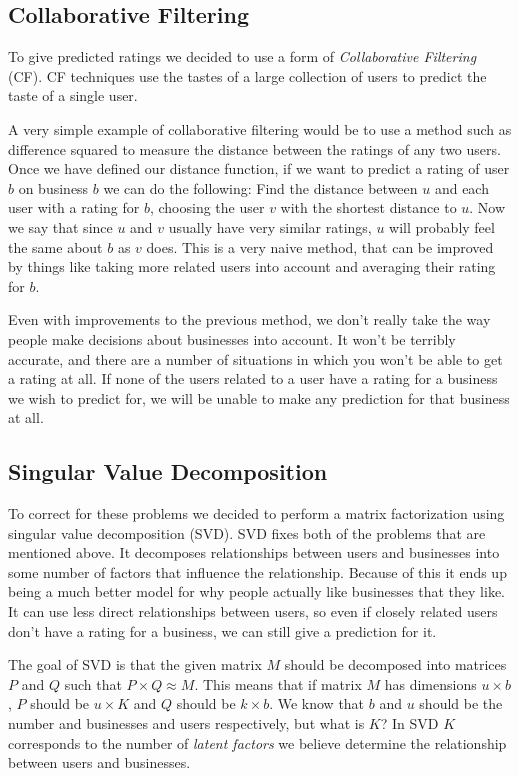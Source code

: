 \subsection{Collaborative Filtering}

To give predicted ratings we decided to use a form of \emph{Collaborative
Filtering} (CF). CF techniques use the tastes of a large collection of users to
predict the taste of a single user.

A very simple example of collaborative filtering would be to use a method such
as difference squared to measure the distance between the ratings of any two
users. Once we have defined our distance function, if we want to predict a
rating of user $b$ on business $b$ we can do the following: Find the distance
between $u$ and each user with a rating for $b$, choosing the user $v$ with the
shortest distance to $u$. Now we say that since $u$ and $v$ usually have very
similar ratings, $u$ will probably feel the same about $b$ as $v$ does. This is
a very naive method, that can be improved by things like taking more related
users into account and averaging their rating for $b$.

Even with improvements to the previous method, we don't really take the way
people make decisions about businesses into account. It won't be terribly
accurate, and there are a number of situations in which you won't be able to get
a rating at all. If none of the users related to a user have a rating for a
business we wish to predict for, we will be unable to make any prediction for
that business at all. 

\subsection{Singular Value Decomposition}
To correct for these problems we decided to perform a matrix factorization
using singular value decomposition (SVD). SVD fixes both of the problems that
are mentioned above. It decomposes relationships between users and businesses
into some number of factors that influence the relationship. Because of this it
ends up being a much better model for why people actually like businesses that
they like. It can use less direct relationships between users, so even if
closely related users don't have a rating for a business, we can still give a
prediction for it. 

The goal of SVD is that the given matrix $M$ should be decomposed into
matrices $P$ and $Q$ such that $P \times Q \approx M $. This means that if
matrix $M$ has dimensions $u \times b$, $P$ should be $u \times K$ and $Q$
should be $k \times b$. We know that $b$ and $u$ should be the number and
businesses and users respectively, but what is $K$? In SVD $K$ corresponds to
the number of \emph{latent factors} we believe determine the relationship
between users and businesses.

